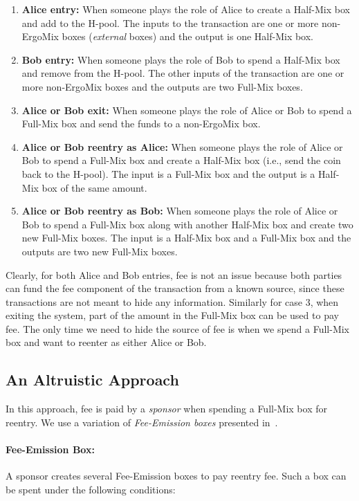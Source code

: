 \documentclass[runningheads]{llncs}
\newcommand{\mixname}{ErgoMix\xspace}
\begin{document}
\begin{enumerate}
    \item \textbf{Alice entry:} When someone plays the role of Alice to create a Half-Mix box and add to the H-pool. The inputs to the transaction are one or more non-\mixname boxes ({\em external} boxes) and the output is one Half-Mix box. 
    \item \textbf{Bob entry:} When someone plays the role of Bob to spend a Half-Mix box and remove from the H-pool. The other inputs of the transaction are one or more non-\mixname boxes and the outputs are two Full-Mix boxes. 
    \item \textbf{Alice or Bob exit:} When someone plays the role of Alice or Bob to spend a Full-Mix box and send the funds to a non-\mixname box. 
    \item \textbf{Alice or Bob reentry as Alice:} When someone plays the role of Alice or Bob to spend a Full-Mix box and create a Half-Mix box (i.e., send the coin back to the H-pool). The input is a Full-Mix box and the output is a Half-Mix box of the same amount.
    \item \textbf{Alice or Bob reentry as Bob:} When someone plays the role of Alice or Bob to spend a Full-Mix box along with another Half-Mix box and create two new Full-Mix boxes. The input is a Half-Mix box and a Full-Mix box and the outputs are two new Full-Mix boxes.
\end{enumerate}

Clearly, for both Alice and Bob entries, fee is not an issue because both parties can fund the fee component of the transaction from a known source, since these transactions are not meant to hide any information. Similarly for case 3, when exiting the system, part of the amount in the Full-Mix box can be used to pay fee. The only time we need to hide the source of fee is when we spend a Full-Mix box and want to reenter as either Alice or Bob. 

\subsection{An Altruistic Approach}
\label{donation}

In this approach, fee is paid by a {\em sponsor} when spending a Full-Mix box for reentry. 
We use a variation of {\em Fee-Emission boxes} presented in~\cite{Fee-Emission}. 

\paragraph{Fee-Emission Box:} A sponsor creates several Fee-Emission boxes to pay reentry fee. Such a box can be spent under the following conditions:
\end{document}
